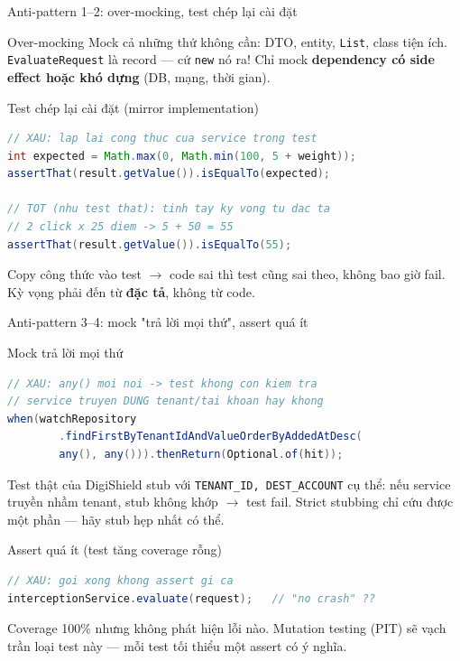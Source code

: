 \documentclass[aspectratio=169,12pt]{beamer}
\begin{document}
\begin{frame}[fragile]{Anti-pattern 1--2: over-mocking, test chép lại cài đặt}
  \begin{alertblock}{Over-mocking}
    Mock cả những thứ không cần: DTO, entity, \texttt{List}, class tiện ích.
    \texttt{EvaluateRequest} là record --- cứ \texttt{new} nó ra! Chỉ mock
    \textbf{dependency có side effect hoặc khó dựng} (DB, mạng, thời gian).
  \end{alertblock}

  \begin{alertblock}{Test chép lại cài đặt (mirror implementation)}
\begin{lstlisting}[language=java,basicstyle=\ttfamily\scriptsize]
// XAU: lap lai cong thuc cua service trong test
int expected = Math.max(0, Math.min(100, 5 + weight));
assertThat(result.getValue()).isEqualTo(expected);

// TOT (nhu test that): tinh tay ky vong tu dac ta
// 2 click x 25 diem -> 5 + 50 = 55
assertThat(result.getValue()).isEqualTo(55);
\end{lstlisting}
    Copy công thức vào test $\to$ code sai thì test cũng sai theo,
    không bao giờ fail. Kỳ vọng phải đến từ \textbf{đặc tả}, không từ code.
  \end{alertblock}
\end{frame}

\begin{frame}[fragile]{Anti-pattern 3--4: mock "trả lời mọi thứ", assert quá ít}
  \begin{alertblock}{Mock trả lời mọi thứ}
\begin{lstlisting}[language=java,basicstyle=\ttfamily\scriptsize]
// XAU: any() moi noi -> test khong con kiem tra
// service truyen DUNG tenant/tai khoan hay khong
when(watchRepository
        .findFirstByTenantIdAndValueOrderByAddedAtDesc(
        any(), any())).thenReturn(Optional.of(hit));
\end{lstlisting}
    Test thật của DigiShield stub với \texttt{TENANT\_ID, DEST\_ACCOUNT} cụ thể:
    nếu service truyền nhầm tenant, stub không khớp $\to$ test fail. Strict
    stubbing chỉ cứu được một phần --- hãy stub hẹp nhất có thể.
  \end{alertblock}

  \begin{alertblock}{Assert quá ít (test tăng coverage rỗng)}
\begin{lstlisting}[language=java,basicstyle=\ttfamily\scriptsize]
// XAU: goi xong khong assert gi ca
interceptionService.evaluate(request);   // "no crash" ??
\end{lstlisting}
    Coverage 100\% nhưng không phát hiện lỗi nào. Mutation testing (PIT)
    sẽ vạch trần loại test này --- mỗi test tối thiểu một assert có ý nghĩa.
  \end{alertblock}
\end{frame}
\end{document}
